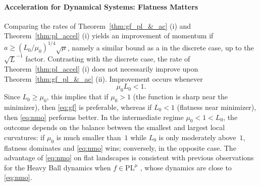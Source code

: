 \documentclass{article}
\newcommand{\jh}[1]{{\color{red} #1}}
\def\pl{{\text{PL}^\mu}}
\newcommand{\sqc}{\text{SQC}_{\tau}^{\mu}}
\theoremstyle{plain}
\theoremstyle{definition}
\theoremstyle{remark}
\begin{document}
\paragraph{Acceleration for Dynamical Systems: Flatness Matters}
Comparing the rates of Theorem~\ref{thm:gf_pl_&_ac} (i) and Theorem~\ref{thm:pl_accel} (i) yields an improvement of momentum if $a \ge (L_0/\mu_0)^{1/4}\sqrt{\mu}$, namely a similar bound as a in the discrete case, up to the $\sqrt{L}^{-1}$ factor. Contrasting with the discrete case, the rate of Theorem~\ref{thm:pl_accel} (i) does not necessarily improve upon Theorem~\ref{thm:gf_pl_&_ac} (ii). Improvement occurs whenever
\[
\mu_0 L_0 < 1.
\]
Since $L_0 \ge \mu_0$, this implies that if $\mu_0>1$ (the function is sharp near the minimizer), then \eqref{eq:gf} is preferable, whereas if $L_0<1$ (flatness near minimizer), then \eqref{eq:nmo} performs better.
In the intermediate regime $\mu_0 < 1 < L_0$, the outcome depends on the balance between the smallest and largest local curvatures: if $\mu_0$ is much smaller than~$1$ while $L_0$ is only moderately above~$1$, flatness dominates and \eqref{eq:nmo} wins; conversely, in the opposite case.
The advantage of \eqref{eq:nmo} on flat landscapes is consistent with previous observations for the Heavy Ball dynamics when $f\in\pl$ \cite{apidopoulos2022convergence, gess2023exponential}, whose dynamics are close to \eqref{eq:nmo}.
\end{document}
